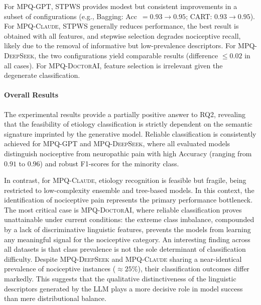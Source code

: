 \documentclass[preprint,12pt,authoryear]{elsarticle}
\newcommand{\dbGPT}{\small\textsc{MPQ-GPT}\xspace}
\newcommand{\dbClaude}{\small\textsc{MPQ-Claude}\xspace}
\newcommand{\dbDeepSeek}{\small\textsc{MPQ-DeepSeek}\xspace}
\newcommand{\dbDoctorAI}{\small\textsc{MPQ-DoctorAI}\xspace}
\begin{document}
For \dbGPT, STPWS provides modest but consistent improvements in a subset of configurations (e.g., Bagging: Acc~$= 0.93 \to 0.95$; CART: $0.93 \to 0.95$). For \dbClaude, STPWS generally reduces performance, the best result is obtained with all features, and stepwise selection degrades nociceptive recall, likely due to the removal of informative but low-prevalence descriptors. For \dbDeepSeek, the two configurations yield comparable results (difference $\leq 0.02$ in all cases). For \dbDoctorAI, feature selection is irrelevant given the degenerate classification.

\paragraph{Overall Results} The experimental results provide a partially positive answer to RQ2, revealing that the feasibility of etiology classification is strictly dependent on the semantic signature imprinted by the generative model. Reliable classification is consistently achieved for \dbGPT and \dbDeepSeek, where all evaluated models distinguish nociceptive from neuropathic pain with high Accuracy (ranging from $0.91$ to $0.96$) and robust F1-scores for the minority class.

In contrast, for \dbClaude, etiology recognition is feasible but fragile, being restricted to low-complexity ensemble and tree-based models. In this context, the identification of nociceptive pain represents the primary performance bottleneck. The most critical case is \dbDoctorAI, where reliable classification proves unattainable under current conditions: the extreme class imbalance, compounded by a lack of discriminative linguistic features, prevents the models from learning any meaningful signal for the nociceptive category. An interesting finding across all datasets is that class prevalence is not the sole determinant of classification difficulty.  Despite \dbDeepSeek and \dbClaude sharing a near-identical prevalence of nociceptive instances ($\approx 25\%$), their classification outcomes differ markedly. This suggests that the qualitative distinctiveness of the linguistic descriptors generated by the LLM plays a more decisive role in model success than mere distributional balance.
\end{document}
